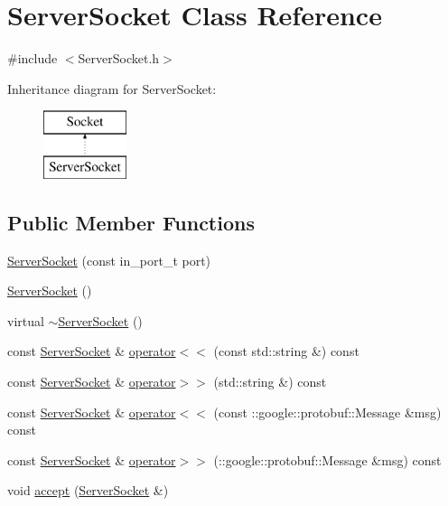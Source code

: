 \hypertarget{class_server_socket}{}\section{Server\+Socket Class Reference}
\label{class_server_socket}


{\ttfamily \#include $<$Server\+Socket.\+h$>$}

Inheritance diagram for Server\+Socket\+:\begin{figure}[H]
\begin{center}
\leavevmode
\includegraphics[height=2.000000cm]{class_server_socket}
\end{center}
\end{figure}
\subsection*{Public Member Functions}
\begin{DoxyCompactItemize}
\item 
\hyperlink{class_server_socket_a3b48c79e2e66bf8ab26b7350275b8ad0}{Server\+Socket} (const in\+\_\+port\+\_\+t port)
\item 
\hyperlink{class_server_socket_a2b3098589541243241ca25495155186c}{Server\+Socket} ()
\item 
virtual \hyperlink{class_server_socket_a510674d924c2544e6b0069e39c36516b}{$\sim$\+Server\+Socket} ()
\item 
const \hyperlink{class_server_socket}{Server\+Socket} \& \hyperlink{class_server_socket_ab5fe4b2d92d7014f7663c1bbacbbeda5}{operator$<$$<$} (const std\+::string \&) const 
\item 
const \hyperlink{class_server_socket}{Server\+Socket} \& \hyperlink{class_server_socket_a6bfabf01766bdb2c7f53274d8d771212}{operator$>$$>$} (std\+::string \&) const 
\item 
const \hyperlink{class_server_socket}{Server\+Socket} \& \hyperlink{class_server_socket_a184d1eff33380dd9708505429bfcbfb5}{operator$<$$<$} (const \+::google\+::protobuf\+::\+Message \&msg) const 
\item 
const \hyperlink{class_server_socket}{Server\+Socket} \& \hyperlink{class_server_socket_a5ff4a820f96e1a9dd5fa234ba3946f83}{operator$>$$>$} (\+::google\+::protobuf\+::\+Message \&msg) const 
\item 
void \hyperlink{class_server_socket_ae550e314a988575d05b1dec1c3c18020}{accept} (\hyperlink{class_server_socket}{Server\+Socket} \&)
\end{DoxyCompactItemize}


